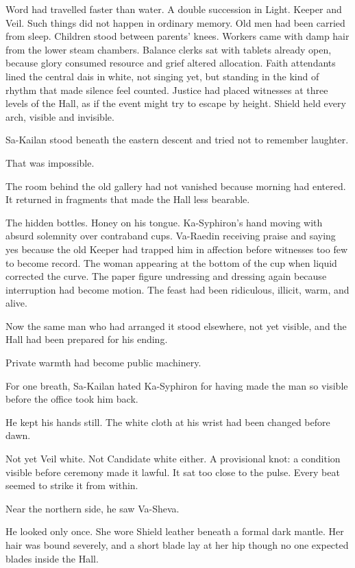 Word had travelled faster than water.
A double succession in Light.
Keeper and Veil.
Such things did not happen in ordinary memory.
Old men had been carried from sleep.
Children stood between parents’ knees.
Workers came with damp hair from the lower steam chambers.
Balance clerks sat with tablets already open, because glory consumed resource and grief altered allocation.
Faith attendants lined the central dais in white, not singing yet, but standing in the kind of rhythm that made silence feel counted.
Justice had placed witnesses at three levels of the Hall, as if the event might try to escape by height.
Shield held every arch, visible and invisible.\par
Sa-Kailan stood beneath the eastern descent and tried not to remember laughter.\par
That was impossible.\par
The room behind the old gallery had not vanished because morning had entered.
It returned in fragments that made the Hall less bearable.\par
The hidden bottles.
Honey on his tongue.
Ka-Syphiron’s hand moving with absurd solemnity over contraband cups.
Va-Raedin receiving praise and saying yes because the old Keeper had trapped him in affection before witnesses too few to become record.
The woman appearing at the bottom of the cup when liquid corrected the curve.
The paper figure undressing and dressing again because interruption had become motion.
The feast had been ridiculous, illicit, warm, and alive.\par
Now the same man who had arranged it stood elsewhere, not yet visible, and the Hall had been prepared for his ending.\par
Private warmth had become public machinery.\par
For one breath, Sa-Kailan hated Ka-Syphiron for having made the man so visible before the office took him back.\par
He kept his hands still.
The white cloth at his wrist had been changed before dawn.\par
Not yet Veil white.
Not Candidate white either.
A provisional knot: a condition visible before ceremony made it lawful.
It sat too close to the pulse.
Every beat seemed to strike it from within.\par
Near the northern side, he saw Va-Sheva.\par
He looked only once.
She wore Shield leather beneath a formal dark mantle.
Her hair was bound severely, and a short blade lay at her hip though no one expected blades inside the Hall.
